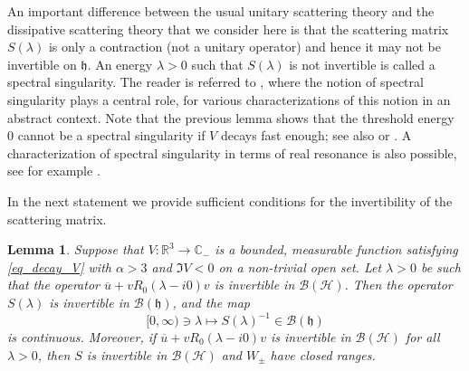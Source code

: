 \documentclass{article}
\def\B{\mathscr B}
\def\C{\mathbb C}
\def\H{\mathcal H}
\def\R{\mathbb R}
\def\HS{\mathfrak h}
\newtheorem{Lemma}[Theorem]{Lemma}
\begin{document}
An important difference between the usual unitary scattering theory and the dissipative scattering theory that we consider here is that the scattering matrix $S(\lambda)$ is only a contraction (not a unitary operator) and hence it may not be invertible on $\HS$. An energy $\lambda>0$ such that $S(\lambda)$ is not invertible is called a spectral singularity. The reader is referred to \cite{FaFr18,FN,FaFr23}, where the notion of spectral singularity plays a central role, for various characterizations of this notion in an abstract context. Note that the previous lemma shows that the threshold energy $0$ cannot be a spectral singularity if $V$ decays fast enough; see also  \cite[Thm.~1.1]{Wa11} or \cite[Prop.~3.7]{FaFr23}. 
A characterization of spectral singularity in terms of real resonance is also possible, see
for example  \cite[Thm.~3.6]{FaFr23}. 

In the next statement we provide sufficient conditions for the invertibility of the scattering
matrix.

\begin{Lemma}\label{lem_S_invert}
Suppose that $V:\R^3\to \C_-$ is a bounded, measurable function satisfying \eqref{eq_decay_V} with $\alpha>3$ and $\Im V<0$ on a non-trivial open set. 
Let $\lambda > 0$ be such that the operator $\overline{u} + vR_0(\lambda-i0)v$
is invertible in $\B(\H)$. Then the operator $S(\lambda)$ is invertible in $\B(\HS)$, 
and the map
\begin{equation*}
[0,\infty)\ni\lambda\mapsto S(\lambda)^{-1}\in\B(\HS)
\end{equation*}
is continuous. Moreover, if $\overline{u} + vR_0(\lambda-i0)v$
is invertible in $\B(\H)$ for all $\lambda>0$, then $S$ is invertible in $\B(\H)$ and $W_\pm$ have closed ranges.
\end{Lemma}
\end{document}

